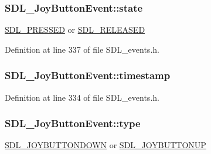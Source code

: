 \hypertarget{struct_s_d_l___joy_button_event_ad3b6f8d9aa2c5e694f664b97d12bcd2b}{
\subsubsection[{state}]{ S\-D\-L\-\_\-\-Joy\-Button\-Event\-::state}}\label{struct_s_d_l___joy_button_event_ad3b6f8d9aa2c5e694f664b97d12bcd2b}
\hyperlink{_s_d_l__events_8h_aee81bbffbc8489bdea8fecd1232c4bd1}{S\-D\-L\-\_\-\-P\-R\-E\-S\-S\-E\-D} or \hyperlink{_s_d_l__events_8h_ad680a069f9fcab80de91b3eefdf29c3c}{S\-D\-L\-\_\-\-R\-E\-L\-E\-A\-S\-E\-D} 

Definition at line 337 of file S\-D\-L\-\_\-events.\-h.

\hypertarget{struct_s_d_l___joy_button_event_ab50b6f7d1ab3ac53df69fc2d6cf5fa2a}{
\subsubsection[{timestamp}]{ S\-D\-L\-\_\-\-Joy\-Button\-Event\-::timestamp}}\label{struct_s_d_l___joy_button_event_ab50b6f7d1ab3ac53df69fc2d6cf5fa2a}


Definition at line 334 of file S\-D\-L\-\_\-events.\-h.

\hypertarget{struct_s_d_l___joy_button_event_a8f3312a046d37fa2884b93f69c4cb655}{
\subsubsection[{type}]{ S\-D\-L\-\_\-\-Joy\-Button\-Event\-::type}}\label{struct_s_d_l___joy_button_event_a8f3312a046d37fa2884b93f69c4cb655}
\hyperlink{_s_d_l__events_8h_a3b589e89be6b35c02e0dd34a55f3fccaa386ac978bc145a45883fe0adab70710b}{S\-D\-L\-\_\-\-J\-O\-Y\-B\-U\-T\-T\-O\-N\-D\-O\-W\-N} or \hyperlink{_s_d_l__events_8h_a3b589e89be6b35c02e0dd34a55f3fccaa76f91c81110f012e3a47cbbc0449e3c3}{S\-D\-L\-\_\-\-J\-O\-Y\-B\-U\-T\-T\-O\-N\-U\-P} 


